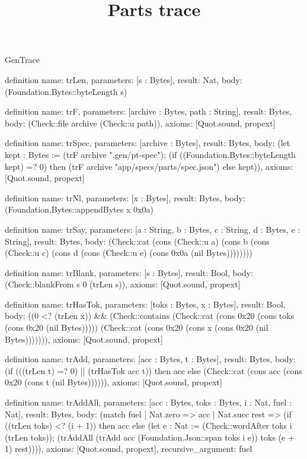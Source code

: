 \begin{lexlean}{GenTrace}
\title{Parts trace}
\begin{semanticmodule}
definition{
  name: trLen,
  parameters: [s : Bytes],
  result: Nat,
  body: (Foundation.Bytes::byteLength s)
}

definition{
  name: trF,
  parameters: [archive : Bytes, path : String],
  result: Bytes,
  body: (Check::file archive (Check::u path)),
  axioms: [Quot.sound, propext]
}

definition{
  name: trSpec,
  parameters: [archive : Bytes],
  result: Bytes,
  body: (let kept : Bytes := (trF archive ".gen/pt-spec"); (if ((Foundation.Bytes::byteLength kept) =? 0) then (trF archive "app/specs/parts/spec.json") else kept)),
  axioms: [Quot.sound, propext]
}

definition{
  name: trNl,
  parameters: [x : Bytes],
  result: Bytes,
  body: (Foundation.Bytes::appendBytes x 0x0a)
}

definition{
  name: trSay,
  parameters: [a : String, b : Bytes, c : String, d : Bytes, e : String],
  result: Bytes,
  body: (Check::cat (cons (Check::u a) (cons b (cons (Check::u c) (cons d (cons (Check::u e) (cons 0x0a (nil Bytes))))))))
}

definition{
  name: trBlank,
  parameters: [s : Bytes],
  result: Bool,
  body: (Check::blankFrom s 0 (trLen s)),
  axioms: [Quot.sound, propext]
}

definition{
  name: trHasTok,
  parameters: [toks : Bytes, x : Bytes],
  result: Bool,
  body: ((0 <? (trLen x)) && (Check::contains (Check::cat (cons 0x20 (cons toks (cons 0x20 (nil Bytes))))) (Check::cat (cons 0x20 (cons x (cons 0x20 (nil Bytes))))))),
  axioms: [Quot.sound, propext]
}

definition{
  name: trAdd,
  parameters: [acc : Bytes, t : Bytes],
  result: Bytes,
  body: (if (((trLen t) =? 0) || (trHasTok acc t)) then acc else (Check::cat (cons acc (cons 0x20 (cons t (nil Bytes)))))),
  axioms: [Quot.sound, propext]
}

definition{
  name: trAddAll,
  parameters: [acc : Bytes, toks : Bytes, i : Nat, fuel : Nat],
  result: Bytes,
  body: (match fuel
    | Nat.zero => acc
    | Nat.succ rest => (if ((trLen toks) <? (i + 1)) then acc else (let e : Nat := (Check::wordAfter toks i (trLen toks)); (trAddAll (trAdd acc (Foundation.Json::span toks i e)) toks (e + 1) rest)))),
  axioms: [Quot.sound, propext],
  recursive_argument: fuel
}


\end{semanticmodule}
\end{lexlean}
